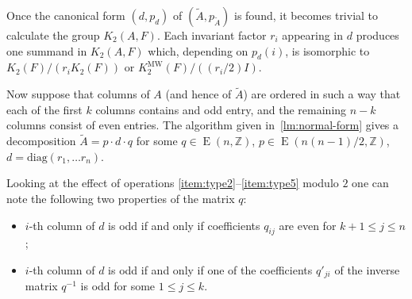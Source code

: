 \documentclass[oneside, 10pt]{amsart}
\theoremstyle{plain}
\theoremstyle{remark}
\theoremstyle{definition}
\DeclareMathOperator{\E}{E}
\newcommand{\ZZ}{\mathbb{Z}}
\newcommand{\K}{K_2}
\newcommand{\Kmw}{K^{\mathrm{MW}}_2}
\begin{document}
Once the canonical form $(d, p_d)$ of $(\widetilde{A}, p_{\widetilde{A}})$ is found, it becomes trivial to calculate the group $\K(A, F)$.
Each invariant factor $r_i$ appearing in $d$ produces one summand in $\K(A, F)$ which, depending on $p_d(i)$, 
 is isomorphic to $\K(F)/(r_i \K(F))$ or $\Kmw(F) / ((r_i/2) I)$.

Now suppose that columns of $A$ (and hence of $\widetilde{A}$) are ordered in such a way that
 each of the first $k$ columns contains and odd entry, and the remaining $n-k$ columns consist of even entries.
The algorithm given in~\cref{lm:normal-form} gives a decomposition
 $\widetilde{A} = p \cdot d \cdot q $ for some $q \in \E(n, \ZZ)$, $p \in \E(n(n-1)/2, \ZZ)$, $d = \mathrm{diag}(r_1, \ldots r_n)$.

Looking at the effect of operations \eqref{item:type2}--\eqref{item:type5} modulo $2$ one can note the following two properties of the matrix $q$:
\begin{itemize}
 \item $i$-th column of $d$ is odd if and only if coefficients $q_{ij}$ are even for $k+1\leq j \leq n$;
 \item $i$-th column of $d$ is odd if and only if one of the coefficients $q'_{ji}$ of the inverse matrix $q^{-1}$ is odd for some $1\leq j\leq k$.
\end{itemize}
\end{document}
